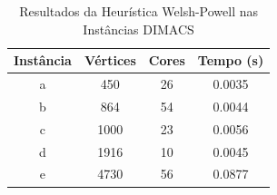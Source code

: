 \begin{table}[H]
\centering
\caption{Resultados da Heurística Welsh-Powell nas Instâncias DIMACS}
\label{tab:resultados_welsh_powell_2}
\begin{tabular}{cccc}
\toprule
Instância & Vértices & Cores & Tempo (s) \\
\midrule
a & 450 & 26 & 0.0035 \\
b & 864 & 54 & 0.0044 \\
c & 1000 & 23 & 0.0056 \\
d & 1916 & 10 & 0.0045 \\
e & 4730 & 56 & 0.0877 \\
\bottomrule
\end{tabular}
\end{table}
